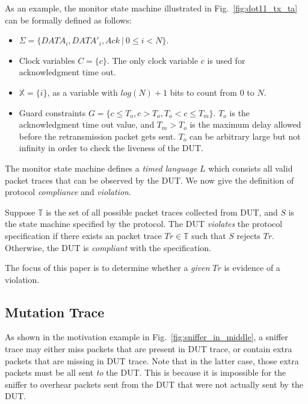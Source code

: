 As an example, the monitor state machine illustrated in
Fig.~\ref{fig:dot11_tx_ta} can be formally defined as follows:

\begin{itemize}
  \item $\Sigma = \{DATA_i, DATA'_i, Ack\ |\ 0 \le i < N\}$.
  \item Clock variables $C = \{c\}$. The only clock variable $c$ is
    used for acknowledgment time out.
  \item $\mathbb{X} = \{i\}$, as a variable with ${\mathit log}(N) + 1$ bits to
    count from $0$ to $N$.  
  \item Guard constraints $G = \{ c \le T_o, c > T_o, T_o < c \le T_m\}$.
    $T_o$ is the acknowledgment time out value, and $T_m >
    T_o$ is the maximum delay allowed before the retransmission packet gets
    sent. $T_o$ can be arbitrary large but not infinity in order to check the
    liveness of the DUT.
\end{itemize}


The monitor state machine defines a \textit{timed language} $L$ which consists
all valid packet traces that can be observed by the DUT.  We now give the
definition of protocol \textit{compliance} and \textit{violation}.

\begin{definition}
  Suppose $\mathbb{T}$ is the set of all possible packet traces collected from
  DUT, and $S$ is the state machine specified by the protocol. The DUT
  \textit{violates} the protocol specification if there exists an
  packet trace $Tr \in \mathbb{T}$ such that $S$ rejects $Tr$.
  Otherwise, the DUT is \textit{compliant} with the specification.
\end{definition}

The focus of this paper is to determine whether a \textit{given} $Tr$ is
evidence of a violation.
%


\subsection{Mutation Trace}
\label{subsec:mutation}

As shown in the motivation example in Fig.~\ref{fig:sniffer_in_middle}, a
sniffer trace may either miss packets that are present in DUT trace, or contain
extra packets that are missing in DUT trace. Note that in the latter case, those
extra packets must be all sent \textit{to} the DUT. This is because it is
impossible for the sniffer to overhear packets sent from the DUT that were not
actually sent by the DUT.

